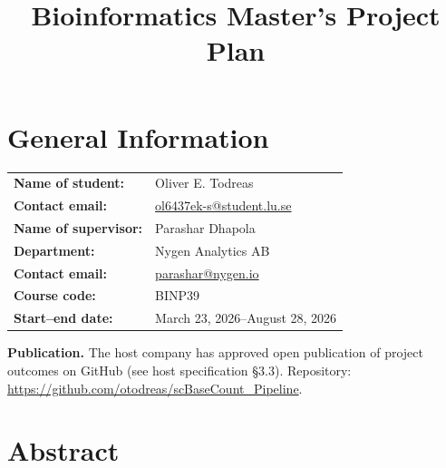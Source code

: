 \documentclass[12pt,a4paper]{article}
\title{\textbf{Bioinformatics Master's Project Plan}}
\date{}
\begin{document}
\maketitle

\section*{General Information}

\begin{tabular}{@{}ll}
    \textbf{Name of student:}      & Oliver E. Todreas \\
    \textbf{Contact email:}        & \href{mailto:ol6437ek-s@student.lu.se}{ol6437ek-s@student.lu.se} \\
    \textbf{Name of supervisor:}   & Parashar Dhapola \\
    \textbf{Department:}      & Nygen Analytics AB \\
    \textbf{Contact email:}        & \href{mailto:parashar@nygen.io}{parashar@nygen.io} \\
    \textbf{Course code:}          & BINP39 \\
    \textbf{Start–end date:}    & March 23, 2026–August 28, 2026 \\
\end{tabular}

\noindent\textbf{Publication.} The host company has approved open publication of project outcomes on GitHub (see host specification §3.3). Repository: \url{https://github.com/otodreas/scBaseCount_Pipeline}.

\section*{Abstract}
\end{document}
